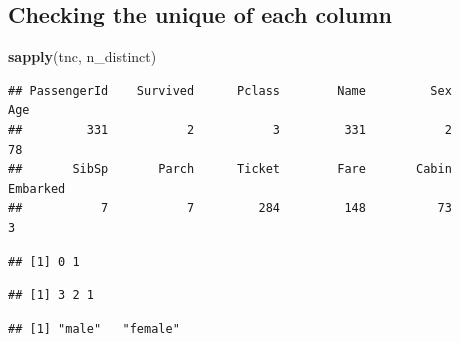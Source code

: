\documentclass[
]{article}
\newenvironment{Shaded}{\begin{snugshade}}{\end{snugshade}}
\newcommand{\FunctionTok}[1]{\textcolor[rgb]{1.00,0.58,0.35}{\textbf{#1}}}
\newcommand{\NormalTok}[1]{\textcolor[rgb]{0.74,0.68,0.62}{#1}}
\newcommand{\SpecialCharTok}[1]{\textcolor[rgb]{0.02,0.61,0.04}{#1}}
\begin{document}
\hypertarget{checking-the-unique-of-each-column}{%
\subsection{Checking the unique of each
column}\label{checking-the-unique-of-each-column}}

\begin{Shaded}
\begin{Highlighting}[]
\FunctionTok{sapply}\NormalTok{(tnc, n\_distinct)}
\end{Highlighting}
\end{Shaded}

\begin{verbatim}
## PassengerId    Survived      Pclass        Name         Sex         Age 
##         331           2           3         331           2          78 
##       SibSp       Parch      Ticket        Fare       Cabin    Embarked 
##           7           7         284         148          73           3
\end{verbatim}

\begin{Shaded}
\end{Shaded}

\begin{verbatim}
## [1] 0 1
\end{verbatim}

\begin{Shaded}
\end{Shaded}

\begin{verbatim}
## [1] 3 2 1
\end{verbatim}

\begin{Shaded}
\end{Shaded}

\begin{verbatim}
## [1] "male"   "female"
\end{verbatim}
\end{document}
